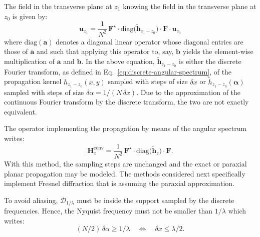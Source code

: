 \documentclass[a4paper]{article}
\newcommand*{\V}[1]{\boldsymbol{#1}}
\newcommand*{\FT}[1]{\widetilde{#1}}
\begin{document}
The field in the transverse plane at $z_{1}$ knowing the field in the
transverse plane at $z_{0}$ is given by:
\begin{equation}
  \label{eq:7}
  \boldsymbol{u}_{z_{1}} = \frac{1}{N^{2}}\,\mathbf{F}^{\star}·
  \mathrm{diag}\bigl(\FT{\boldsymbol{h}}_{z_{1} - z_{0}}\bigr)·
  \mathbf{F}·\boldsymbol{u}_{z_{0}}
\end{equation}
where $\mathrm{diag}(\boldsymbol{a})$ denotes a diagonal linear operator whose
diagonal entries are those of $\boldsymbol{a}$ and such that applying this
operator to, say, $\boldsymbol{b}$ yields the element-wise multiplication of
$\boldsymbol{a}$ and $\boldsymbol{b}$. In the above equation,
$\FT{\boldsymbol{h}}_{z_{1} - z_{0}}$ is either the discrete Fourier transform,
as defined in Eq.~\eqref{eq:discrete-angular-spectrum}, of the propagation
kernel $h_{z_{1} - z_{0}}(x,y)$ sampled with steps of size $δx$ or
$\FT{h}_{z_{1} - z_{0}}(\V{α})$ sampled with steps of size $δα = 1/(N\,δx)$.
Due to the approximation of the continuous Fourier transform by the discrete
transform, the two are not exactly equivalent.

The operator implementing the propagation by means of the angular spectrum
writes:
\begin{equation}
  \label{eq:angular-spectrum-propagator}
  \mathbf{H}_{z}^{\text{conv}} = \frac{1}{N^{2}}\,\mathbf{F}^{\star}·
  \mathrm{diag}\bigl(\FT{\boldsymbol{h}}_{z}\bigr)·
  \mathbf{F}.
\end{equation}
With this method, the sampling steps are unchanged and the exact or paraxial
planar propagation may be modeled. The methods considered next specifically
implement Fresnel diffraction that is assuming the paraxial approximation.

To avoid aliasing, $\mathcal{D}_{1/λ}$ must be inside the support sampled by
the discrete frequencies. Hence, the Nyquist frequency must not be smaller than
$1/λ$ which writes:
\begin{equation}
  \label{eq:no-aliasing-condition}
  (N/2)\,δα ≥ 1/λ
  \quad\Longleftrightarrow\quad
  δx ≤ λ/2.
\end{equation}
\end{document}
